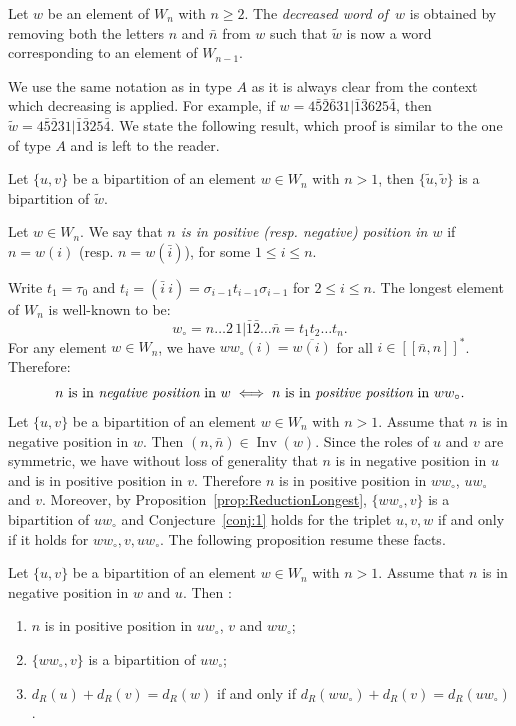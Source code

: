 \documentclass[ALCO,Unicode]{cedram}
\theoremstyle{definition}
\DeclareMathOperator{\invs}{Inv}
\newcommand{\dec}[1]{\widetilde{#1}}
\newcommand{\Bsetnn}{[\![\bar{n},n ]\!]^*}
\begin{document}
\begin{defi}
Let $w$ be an element of $W_n$ with $n \geq 2$. The \emph{decreased word of}~$w$ is obtained by removing both the letters $n$ and $\bar{n}$ from $w$ such that $\dec{w}$ is now a word corresponding to an element of $W_{n-1}$.
\end{defi}

We use the same notation as in type $A$ as it is always clear from the context which decreasing is applied. For example, if $w = 4 \bar{5} \bar{2} \bar{6} 3 1 | \bar{1} \bar{3} 6 2 5 \bar{4}$, then $\dec{w} = 4 \bar{5} \bar{2} 3 1 | \bar{1} \bar{3} 2 5 \bar{4}$. We state the following result, which proof is similar to the one of type $A$ and is left to the reader.

\begin{lemm}
\label{lem:B-dec}
Let $\lbrace u, v \rbrace$ be a bipartition of an element $w \in W_n$ with $n > 1$, then $\lbrace \dec{u}, \dec{v} \rbrace$ is a bipartition of $\dec{w}$.
\end{lemm}



\begin{defi} Let $w\in W_n$. We say that {\em $n$ is in positive (resp. negative) position in $w$} if $n=w(i)$ (resp. $n=w(\bar i)$), for some $1\leq i\leq n$. 
\end{defi}

Write $t_1=\tau_0$ and $t_{i}=(\bar i\ i)=\sigma_{i-1}t_{i-1} \sigma_{i-1}$ for $2\leq i\leq n$.  The longest element of $W_n$ is well-known to be:
$$
w_\circ= n \dots 2\,1 |\bar 1  \bar 2\dots \bar n = t_1t_2\dots t_n.
$$
For any element $w\in W_n$, we have $ww_\circ (i)=\overline{w(i)}$ for all $i\in \Bsetnn$. Therefore:
$$
 n  \textrm{ is in {\em negative position} in }w \iff n \textrm{ is in {\em positive position} in }ww_\circ. 
$$
Let $\lbrace u, v \rbrace$ be a bipartition of an element $w \in W_n$ with $n > 1$. Assume that $n$ is in negative position in $w$. Then $(n,\bar n)\in\invs(w)$. Since the roles of $u$ and $v$ are symmetric, we have without loss of generality that  $n$ is in negative position in $u$ and is in positive position in $v$. Therefore $n$ is in positive position in $ww_\circ$, $uw_\circ$ and $v$. Moreover, by Proposition~\ref{prop:ReductionLongest}, $\{ww_\circ,v\}$ is a bipartition of $uw_\circ$ and Conjecture~\ref{conj:1} holds for the triplet $u,v,w$ if and only if it holds for $ww_\circ,v,uw_\circ$. The following proposition resume these facts.
\begin{prop}
\label{prop:B-pos}
Let $\lbrace u, v \rbrace$ be a bipartition of an element $w \in W_n$ with $n > 1$. Assume that $n$ is in negative position in $w$ and $u$. Then :
\begin{enumerate}
\item $n$ is in positive position in $uw_\circ$, $v$ and $ww_\circ$;
\item $\{ww_\circ,v\}$ is a bipartition of $uw_\circ$;
\item $d_R(u)+d_R(v)=d_R(w)$ if and only if $d_R(ww_\circ)+d_R(v)=d_R(uw_\circ)$.
\end{enumerate}
\end{prop}
\end{document}
